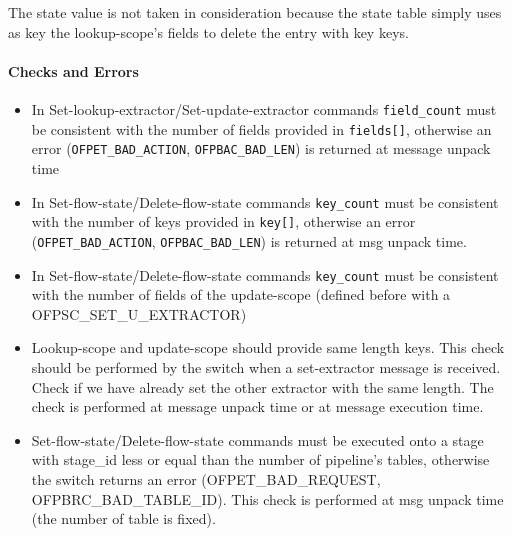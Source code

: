 
The state value is not taken in consideration because the state table simply uses as key the lookup-scope's fields to delete the entry with key keys.

\paragraph{Checks and Errors}

\begin{itemize}
\item In Set-lookup-extractor/Set-update-extractor commands \texttt{field\_count} must be consistent with the number of fields provided in \texttt{fields[]}, otherwise an error (\texttt{OFPET\_BAD\_ACTION}, \texttt{OFPBAC\_BAD\_LEN}) is returned at message unpack time

\item In Set-flow-state/Delete-flow-state commands \texttt{key\_count} must be consistent with the number of keys provided in \texttt{key[]}, otherwise an error (\texttt{OFPET\_BAD\_ACTION}, \texttt{OFPBAC\_BAD\_LEN}) is returned at msg unpack time. 

\item In Set-flow-state/Delete-flow-state commands \texttt{key\_count} must be consistent with the number of fields of the update-scope (defined before with a OFPSC\_SET\_U\_EXTRACTOR)

\item Lookup-scope and update-scope should provide same length keys. This check should be performed by the switch when a set-extractor message is received. Check if we have already set the other extractor with the same length. The check is performed at message unpack time or at message execution time. 

\item Set-flow-state/Delete-flow-state commands must be executed onto a stage with stage\_id less or equal than the number of pipeline’s tables, otherwise the switch returns an error (OFPET\_BAD\_REQUEST, OFPBRC\_BAD\_TABLE\_ID). This check is performed at msg unpack time (the number of table is fixed).

\end{itemize}